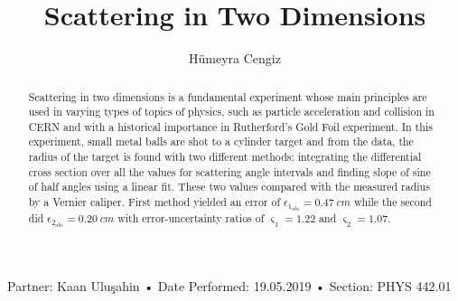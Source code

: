 \documentclass[a4paper]{article}
\title{Scattering in Two Dimensions}
\author{Hümeyra Cengiz}
\date{\vspace{-5ex}}
\begin{document}
\maketitle

\begin{large}
\begin{center}
Partner: Kaan Uluşahin • Date Performed: 19.05.2019 • Section: PHYS 442.01 
\end{center}
\end{large}


\begin{abstract}
Scattering in two dimensions is a fundamental experiment whose main principles are used in varying types of topics of physics, such as particle acceleration and collision in CERN and with a historical importance in Rutherford's Gold Foil experiment. In this experiment, small metal balls are shot to a cylinder target and from the data, the radius of the target is found with two different methods: integrating the differential cross section over all the values for scattering angle intervals and finding slope of sine of half angles using a linear fit. These two values compared with the measured radius by a Vernier caliper. First method yielded an error of $\epsilon_{1_{abs}} = 0.47 \ cm$ while the second did $\epsilon_{2_{abs}} = 0.20 \ cm$ with error-uncertainty ratios of $\varsigma_1 = 1.22$ and $\varsigma_2 = 1.07$.
\end{abstract}
\end{document}
